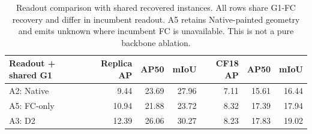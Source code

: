 \begin{table}[!ht]
\centering
\caption{Readout comparison with shared recovered instances. All rows share G1-FC recovery and differ in incumbent readout. A5 retains Native-painted geometry and emits unknown where incumbent FC is unavailable. This is not a pure backbone ablation.}
\label{tab:readout-shared}
\fontsize{9}{11}\selectfont
\setlength{\tabcolsep}{4pt}
\begin{tabular*}{\textwidth}{@{\extracolsep{\fill}}lrrrrrr@{}}
\toprule
Readout + shared G1 & Replica AP & AP50 & mIoU & CF18 AP & AP50 & mIoU \\
\midrule
A2: Native & 9.44 & 23.69 & 27.96 & 7.11 & 15.61 & 16.44 \\
A5: FC-only & 10.94 & 21.88 & 23.72 & 8.32 & 17.39 & 17.94 \\
A3: D2 & 12.39 & 26.06 & 30.27 & 8.23 & 17.83 & 19.02 \\
\bottomrule
\end{tabular*}
\end{table}
